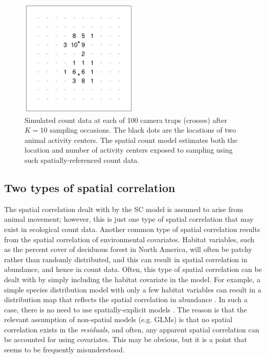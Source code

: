 \begin{figure}%
\centering
\includegraphics[width=0.5\textwidth]{Ch18-Unmarked/figs/heuristic}
\caption{Simulated count data at each of 100 camera traps
  (crosses) after $K=10$ sampling occasions. The black dots are the
  locations of two animal activity centers. The
  spatial count model estimates %
  both the location and number of activity centers exposed to
  sampling using such spatially-referenced count data.}
\label{chapt-unmarked.fig.heur}
\end{figure}




\subsection{Two types of spatial correlation}

The spatial correlation dealt with by the SC model is assumed to arise
from animal movement; however, this is just one type of spatial
correlation that may exist in ecological count data. Another common
type of spatial correlation results from the spatial correlation of
environmental covariates. Habitat variables, such as the percent cover
of deciduous forest in North America, will often be patchy rather than randomly
distributed, and this can result in spatial correlation in abundance,
and hence in count data.  %
Often, this type of spatial correlation can be dealt with by simply including
the habitat covariate in the model. For example, a simple species
distribution model with only a few habitat variables can result in a
distribution map that reflects the spatial correlation in abundance
\citep{sillett_etal:2012,royle_etal:2012mee2}. In such a case, there is no
need to use spatially-explicit models %
\citep{besag_kooperber:1995,lichstein_etal:2002,wikle:2010}.  The reason is that the
relevant assumption of non-spatial models (e.g. GLMs) is that
no spatial correlation exists in the \textit{residuals}, and often,
any apparent spatial correlation can be accounted for using
covariates. This may be obvious, but
it is a point that seems to be frequently misunderstood.

